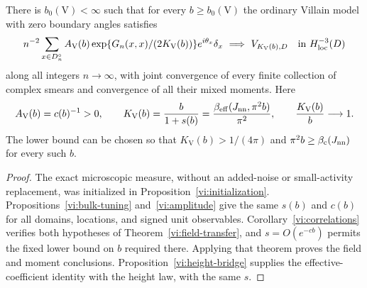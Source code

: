 \begin{theorem}\label{vi:villain-spin}
There is $b_0(\mathrm V)<\infty$ such that for every $b\ge b_0(\mathrm V)$
the ordinary Villain model with zero boundary angles satisfies
\[
 n^{-2}\sum_{x\in D_n^\circ}
 A_{\mathrm V}(b)\exp\{G_n(x,x)/(2K_{\mathrm V}(b))\}
       e^{i\theta_x}\delta_x
 \ \Longrightarrow\ V_{K_{\mathrm V}(b),D}
       \quad\hbox{in }H^{-3}_{\mathrm{loc}}(D)
\]
along all integers $n\to\infty$, with joint convergence of every finite
collection of complex smears and convergence of all their mixed moments.
Here
\[
 A_{\mathrm V}(b)=c(b)^{-1}>0,\qquad
 K_{\mathrm V}(b)=\frac b{1+s(b)}
  =\frac{\beta_{\mathrm{eff}}(J_{\mathrm{nn}},\pi^2b)}{\pi^2},\qquad
 \frac{K_{\mathrm V}(b)}b\longrightarrow1.
\]
The lower bound can be chosen so that $K_{\mathrm V}(b)>1/(4\pi)$ and
$\pi^2b\ge\beta_{\mathrm c}(J_{\mathrm{nn}})$ for every such $b$.
\end{theorem}

\begin{proof}
The exact microscopic measure, without an added-noise or small-activity
replacement, was initialized in Proposition~\ref{vi:initialization}.
Propositions~\ref{vi:bulk-tuning} and~\ref{vi:amplitude} give the same
$s(b)$ and $c(b)$ for all domains, locations, and signed unit observables.
Corollary~\ref{vi:correlations} verifies both hypotheses of
Theorem~\ref{vi:field-transfer}, and $s=O(e^{-cb})$ permits the fixed
lower bound on $b$ required there.  Applying that theorem proves the field
and moment conclusions.  Proposition~\ref{vi:height-bridge} supplies the
effective-coefficient identity with the height law, with the same $s$.
\end{proof}
